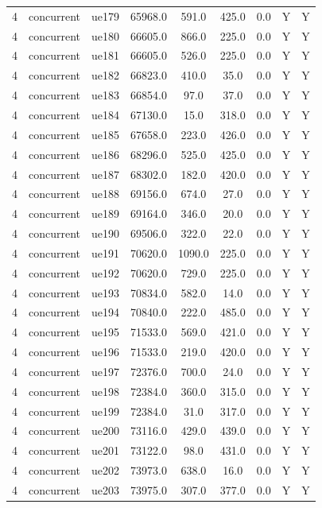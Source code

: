 \begin{table}[ht]
\begin{tabular}{|c|c|c|c|c|c|c|c|c|}
4 & concurrent & ue179 & 65968.0 & 591.0 & 425.0 & 0.0 & Y & Y \\
4 & concurrent & ue180 & 66605.0 & 866.0 & 225.0 & 0.0 & Y & Y \\
4 & concurrent & ue181 & 66605.0 & 526.0 & 225.0 & 0.0 & Y & Y \\
4 & concurrent & ue182 & 66823.0 & 410.0 & 35.0 & 0.0 & Y & Y \\
4 & concurrent & ue183 & 66854.0 & 97.0 & 37.0 & 0.0 & Y & Y \\
4 & concurrent & ue184 & 67130.0 & 15.0 & 318.0 & 0.0 & Y & Y \\
4 & concurrent & ue185 & 67658.0 & 223.0 & 426.0 & 0.0 & Y & Y \\
4 & concurrent & ue186 & 68296.0 & 525.0 & 425.0 & 0.0 & Y & Y \\
4 & concurrent & ue187 & 68302.0 & 182.0 & 420.0 & 0.0 & Y & Y \\
4 & concurrent & ue188 & 69156.0 & 674.0 & 27.0 & 0.0 & Y & Y \\
4 & concurrent & ue189 & 69164.0 & 346.0 & 20.0 & 0.0 & Y & Y \\
4 & concurrent & ue190 & 69506.0 & 322.0 & 22.0 & 0.0 & Y & Y \\
4 & concurrent & ue191 & 70620.0 & 1090.0 & 225.0 & 0.0 & Y & Y \\
4 & concurrent & ue192 & 70620.0 & 729.0 & 225.0 & 0.0 & Y & Y \\
4 & concurrent & ue193 & 70834.0 & 582.0 & 14.0 & 0.0 & Y & Y \\
4 & concurrent & ue194 & 70840.0 & 222.0 & 485.0 & 0.0 & Y & Y \\
4 & concurrent & ue195 & 71533.0 & 569.0 & 421.0 & 0.0 & Y & Y \\
4 & concurrent & ue196 & 71533.0 & 219.0 & 420.0 & 0.0 & Y & Y \\
4 & concurrent & ue197 & 72376.0 & 700.0 & 24.0 & 0.0 & Y & Y \\
4 & concurrent & ue198 & 72384.0 & 360.0 & 315.0 & 0.0 & Y & Y \\
4 & concurrent & ue199 & 72384.0 & 31.0 & 317.0 & 0.0 & Y & Y \\
4 & concurrent & ue200 & 73116.0 & 429.0 & 439.0 & 0.0 & Y & Y \\
4 & concurrent & ue201 & 73122.0 & 98.0 & 431.0 & 0.0 & Y & Y \\
4 & concurrent & ue202 & 73973.0 & 638.0 & 16.0 & 0.0 & Y & Y \\
4 & concurrent & ue203 & 73975.0 & 307.0 & 377.0 & 0.0 & Y & Y \\

\end{tabular}
\end{table}
